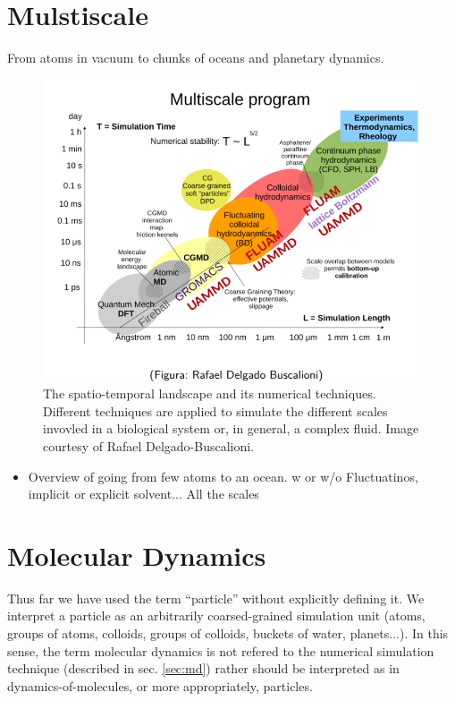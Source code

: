 \documentclass[ twoside,openright,titlepage,numbers=noenddot,%
headinclude,footinclude,cleardoublepage=empty,abstract=on,
BCOR=5mm,paper=a4,fontsize=11pt, dvipsnames
]{scrreprt}
\begin{document}
\section{Mulstiscale}
From atoms in vacuum to chunks of oceans and planetary dynamics.
\begin{figure}[h]
  \centering
  \includegraphics[width=\textwidth]{landscape}
  \caption{The spatio-temporal landscape and its numerical techniques. Different techniques are applied to simulate the different scales invovled in a biological system or, in general, a complex fluid. Image courtesy of Rafael Delgado-Buscalioni.}
\end{figure}
\begin{itemize}
\item Overview of going from few atoms to an ocean. w or w/o Fluctuatinos, implicit or explicit solvent... All the scales
\end{itemize}
\section{Molecular Dynamics}
Thus far we have used the term ``particle'' without explicitly defining it. We interpret a particle as an arbitrarily coarsed-grained simulation unit (atoms, groups of atoms, colloids, groups of colloids, buckets of water, planets...). In this sense, the term molecular dynamics is not refered to the numerical simulation technique (described in sec. \ref{sec:md}) rather should be interpreted as in dynamics-of-molecules, or more appropriately, particles.
\end{document}

